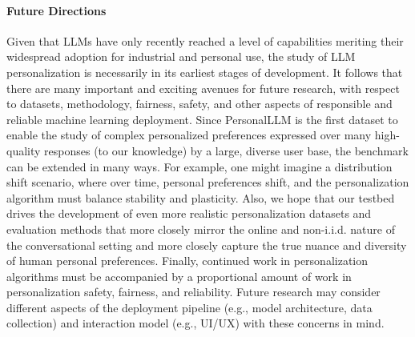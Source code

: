 \paragraph{Future Directions} Given that LLMs have only recently reached a level of capabilities meriting their widespread adoption for industrial and personal use, the study of LLM personalization is necessarily in its earliest stages of development.  
It follows that there are many important and exciting avenues for future research, with respect to datasets, methodology, fairness, safety, and other aspects of responsible and reliable machine learning deployment.  
Since \textsf{PersonalLLM} is the first dataset to enable the study of complex personalized preferences expressed over many high-quality responses (to our knowledge) by a large, diverse user base, the benchmark can be extended in many ways. 
For example, one might imagine a distribution shift scenario, where over time, personal preferences shift, and the personalization algorithm must balance stability and plasticity.  
Also, we hope that our testbed drives the development of even more realistic personalization datasets and evaluation methods that more closely mirror the online and non-i.i.d. nature of the conversational setting and more closely capture the true nuance and diversity of human personal preferences.  Finally, continued work in personalization algorithms must be accompanied by a proportional amount of work in personalization safety, fairness, and reliability.  Future research may consider different aspects of the deployment pipeline (e.g., model architecture, data collection) and interaction model (e.g., UI/UX) with these concerns in mind.

